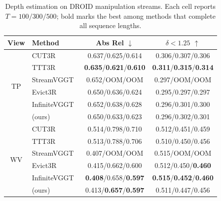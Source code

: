\begin{table}[t]
    \centering
    \caption{Depth estimation on DROID manipulation streams. Each cell reports $T{=}100/300/500$; bold marks the best among methods that complete all sequence lengths.}
    \label{tab:depth}
    \tabletext
    \setlength{\tabcolsep}{3pt}
    \begin{tabular}{clcc}
        \toprule
        View & Method & Abs Rel $\downarrow$ & $\delta{<}1.25$ $\uparrow$ \\
        \midrule
        \multirow{6}{*}{TP}
        & CUT3R~\cite{wang2025cut3r}                & 0.637/0.625/0.614 & 0.306/0.307/0.306 \\
        & TTT3R~\cite{chen2025ttt3r}                & \textbf{0.635}/\textbf{0.621}/\textbf{0.610} & \textbf{0.311}/\textbf{0.315}/\textbf{0.314} \\
        & StreamVGGT~\cite{zhuo2025streamvggt}      & 0.652/OOM/OOM     & 0.297/OOM/OOM \\
        & Evict3R~\cite{mahdi2025evict3r}           & 0.650/0.636/0.624 & 0.295/0.297/0.297 \\
        & InfiniteVGGT~\cite{yuan2026infinitevggt}  & 0.652/0.638/0.628 & 0.296/0.301/0.300 \\
        & \method{} (ours)                          & 0.650/0.633/0.623 & 0.296/0.302/0.301 \\
        \midrule
        \multirow{6}{*}{WV}
        & CUT3R~\cite{wang2025cut3r}                & 0.514/0.798/0.710 & 0.512/0.451/0.459 \\
        & TTT3R~\cite{chen2025ttt3r}                & 0.513/0.788/0.706 & 0.510/0.450/0.456 \\
        & StreamVGGT~\cite{zhuo2025streamvggt}      & 0.407/OOM/OOM     & 0.515/OOM/OOM \\
        & Evict3R~\cite{mahdi2025evict3r}           & 0.415/0.662/0.600 & 0.512/0.450/\textbf{0.460} \\
        & InfiniteVGGT~\cite{yuan2026infinitevggt}  & \textbf{0.408}/0.658/\textbf{0.597} & \textbf{0.515}/\textbf{0.452}/\textbf{0.460} \\
        & \method{} (ours)                          & 0.413/\textbf{0.657}/\textbf{0.597} & 0.511/0.447/0.456 \\
        \bottomrule
    \end{tabular}
\end{table}

